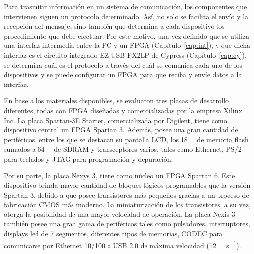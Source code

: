 
Para trasmitir información en un sistema de comunicación, los componentes que intervienen siguen un protocolo determinado. Así, no solo se facilita el envío y la recepción del mensaje, sino también que determina a cada dispositivo los procedimiento que debe efectuar. Por este motivo, una vez definido que se utiliza una interfaz intermedia entre la PC y un FPGA (Capítulo~\ref{cap:int}), y que dicha interfaz es el circuito integrado EZ-USB FX2LP de Cypress (Capítulo~\ref{cap:cy}), se determina cuál es el protocolo a través del cuál se comunica cada uno de los dispositivos y se puede configurar un FPGA para que reciba y envíe datos a la interfaz.

En base a los materiales disponibles, se evaluaron tres placas de desarrollo diferentes, todas con FPGA diseñadas y comercializadas por la empresa Xilinx Inc. La placa Spartan-3E Starter, comercializada por Digilent, tiene como dispositivo central un FPGA Spartan 3. Además, posee una gran cantidad de periféricos, entre los que se destacan su pantalla LCD, los \SI{18}{\mega\byte} de memoria flash sumados a \SI{64}{\mega\byte} de SDRAM y transceptores varios, tales como Ethernet, PS/2 para teclados y JTAG para programación y depuración.

Por su parte, la placa Nexys 3, tiene como núcleo un FPGA Spartan 6. Este dispositivo brinda mayor cantidad de bloques lógicos programables que la versión Spartan 3, debido a que posee transistores más pequeños gracias a un proceso de fabricación CMOS más moderno. La miniaturización de los transistores, a su vez, otorga la posibilidad de una mayor velocidad de operación. La placa Nexis 3 también posee una gran gama de periféricos tales como pulsadores, interruptores, displays led de 7 segmentos, diferentes tipos de memorias, CODEC para comunicarse por Ethernet 10/100 o USB 2.0 de máxima velocidad (\SI{12}{\mega\bit\per\second}).

